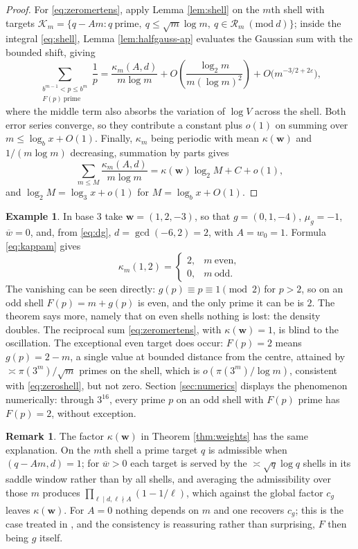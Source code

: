 \documentclass[11pt,reqno]{amsart}
\theoremstyle{plain}
\theoremstyle{definition}
\newtheorem{remark}[theorem]{Remark}
\newtheorem{example}[theorem]{Example}
\begin{document}
\begin{proof}
For \eqref{eq:zeromertens}, apply Lemma \ref{lem:shell} on the $m$th shell with targets $\mathcal K_m=\{q-Am: q\ \text{prime},\ q\le\sqrt m\log m,\ q\in\mathcal R_m\ (\mathrm{mod}\ d)\}$; inside the integral \eqref{eq:shell}, Lemma \ref{lem:halfgauss-ap} evaluates the Gaussian sum with the bounded shift, giving
\[
\sum_{\substack{b^{m-1}<p\le b^{m}\\ F(p)\ \text{prime}}}\frac1p
=\frac{\kappa_m(A,d)}{m\log m}
+O\!\left(\frac{\log_2m}{m(\log m)^{2}}\right)
+O\big(m^{-3/2+2\varepsilon}\big),
\]
where the middle term also absorbs the variation of $\log V$ across the shell. Both error series converge, so they contribute a constant plus $o(1)$ on summing over $m\le\log_bx+O(1)$. Finally, $\kappa_m$ being periodic with mean $\kappa(\mathbf w)$ and $1/(m\log m)$ decreasing, summation by parts gives
\[
\sum_{m\le M}\frac{\kappa_m(A,d)}{m\log m}=\kappa(\mathbf w)\log_2M+C+o(1),
\]
and $\log_2M=\log_3x+o(1)$ for $M=\log_bx+O(1)$.
\end{proof}

\begin{example}\label{ex:base3}
In base $3$ take $\mathbf w=(1,2,-3)$, so that $g=(0,1,-4)$, $\mu_g=-1$, $\overline w=0$, and, from \eqref{eq:dg}, $d=\gcd(-6,2)=2$, with $A=w_0=1$. Formula \eqref{eq:kappam} gives
\[
\kappa_m(1,2)=\begin{cases}2,&m\ \text{even},\\ 0,&m\ \text{odd}.\end{cases}
\]
The vanishing can be seen directly: $g(p)\equiv p\equiv1\pmod2$ for $p>2$, so on an odd shell $F(p)=m+g(p)$ is even, and the only prime it can be is $2$. The theorem says more, namely that on even shells nothing is lost: the density doubles. The reciprocal sum \eqref{eq:zeromertens}, with $\kappa(\mathbf w)=1$, is blind to the oscillation. The exceptional even target does occur: $F(p)=2$ means $g(p)=2-m$, a single value at bounded distance from the centre, attained by $\asymp\pi(3^m)/\sqrt m$ primes on the shell, which is $o(\pi(3^m)/\log m)$, consistent with \eqref{eq:zeroshell}, but not zero. Section \ref{sec:numerics} displays the phenomenon numerically: through $3^{16}$, every prime $p$ on an odd shell with $F(p)$ prime has $F(p)=2$, without exception.
\end{example}

\begin{remark}\label{rem:factor}
The factor $\kappa(\mathbf w)$ in Theorem \ref{thm:weights} has the same explanation. On the $m$th shell a prime target $q$ is admissible when $(q-Am,d)=1$; for $\overline w>0$ each target is served by the $\asymp\sqrt q\log q$ shells in its saddle window rather than by all shells, and averaging the admissibility over those $m$ produces $\prod_{\ell\mid d,\ell\nmid A}(1-1/\ell)$, which against the global factor $c_g$ leaves $\kappa(\mathbf w)$. For $A=0$ nothing depends on $m$ and one recovers $c_g$; this is the case treated in \cite{vibefrtz}, and the consistency is reassuring rather than surprising, $F$ then being $g$ itself.
\end{remark}
\end{document}
